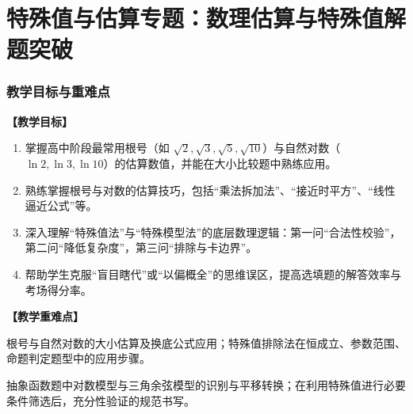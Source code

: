 \documentclass[11pt,a4paper]{ctexart}
\begin{document}





\newpage
\part{特殊值与估算专题：数理估算与特殊值解题突破}

\section{教学目标与重难点}
\textbf{【教学目标】}
\begin{enumerate}[label=\arabic*. , leftmargin=2em, itemsep=0.1em, topsep=0.2em]
  \item 掌握高中阶段最常用根号（如 \(\sqrt{2},\sqrt{3},\sqrt{5},\sqrt{10}\)）与自然对数（\(\ln 2, \ln 3, \ln 10\)）的估算数值，并能在大小比较题中熟练应用。
  \item 熟练掌握根号与对数的估算技巧，包括“乘法拆加法”、“接近时平方”、“线性逼近公式”等。
  \item 深入理解“特殊值法”与“特殊模型法”的底层数理逻辑：第一问“合法性校验”，第二问“降低复杂度”，第三问“排除与卡边界”。
  \item 帮助学生克服“盲目瞎代”或“以偏概全”的思维误区，提高选填题的解答效率与考场得分率。
\end{enumerate}

\vspace{0.8em}
\textbf{【教学重难点】}
\begin{description}[leftmargin=2em, itemsep=0.1em, topsep=0.2em]
  \item[重点] 根号与自然对数的大小估算及换底公式应用；特殊值排除法在恒成立、参数范围、命题判定题型中的应用步骤。
  \item[难点] 抽象函数题中对数模型与三角余弦模型的识别与平移转换；在利用特殊值进行必要条件筛选后，充分性验证的规范书写。
\end{description}
\end{document}
